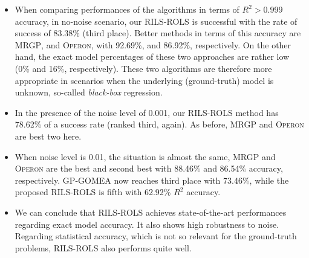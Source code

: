 \documentclass{bmcart}
\begin{document}
\begin{itemize}
	\item When comparing performances of the algorithms in terms of $R^2 > 0.999$ accuracy, in no-noise scenario, our \textsc{RILS}-\textsc{ROLS} is successful with the rate of success of 83.38\% (third place). Better methods in terms of this accuracy are \textsc{MRGP}, and \textsc{Operon}, with 92.69\%, and 86.92\%, respectively. On the other hand, the exact model percentages of these two approaches are rather low (0\% and 16\%, respectively). These two algorithms are therefore more appropriate in scenarios when the underlying (ground-truth) model is unknown, so-called \emph{black-box} regression. 
	
	\item  In the presence of the noise level of 0.001, our \textsc{RILS-ROLS} method has 78.62\% of a success rate (ranked third, again).  As before, \textsc{MRGP} and \textsc{Operon} are best two here. 
	
	\item   When noise level is 0.01, the situation is almost the same, \textsc{MRGP} and \textsc{Operon} are the best and second best with 88.46\% and 86.54\% accuracy, respectively. \textsc{GP-GOMEA} now reaches third place with 73.46\%, while the proposed \textsc{RILS-ROLS} is fifth with 62.92\% $R^2$ accuracy.
	
	\item We can conclude that \textsc{RILS}-\textsc{ROLS} achieves state-of-the-art performances regarding exact model accuracy. It also shows high robustness to noise. Regarding statistical accuracy, which is not so relevant for the ground-truth problems, \textsc{RILS}-\textsc{ROLS} also performs quite well. 
	
\end{itemize}
\end{document}
